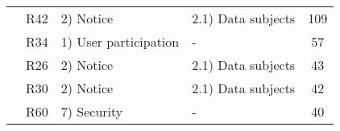 \begin{table}[ht]
{\begin{tabular}{@{}ccllc@{}}
		\multicolumn{1}{l}{}                                  & R42                  & 2) Notice                             & 2.1) Data subjects                                                     & 109                                                                        \\
		\multicolumn{1}{l}{}                                  & R34                  & 1) User participation                 & -                                                                      & 57                                                                         \\
		\multicolumn{1}{l}{}                                  & R26                  & 2) Notice                             & 2.1) Data subjects                                                     & 43                                                                         \\
		\multicolumn{1}{l}{}                                  & R30                  & 2) Notice                             & 2.1) Data subjects                                                     & 42                                                                         \\
		\multicolumn{1}{l}{}                                  & R60                  & 7) Security                           & -                                                                      & 40                                                                         \\ \bottomrule
	\end{tabular}%
}
\end{table}

\begin{comment}
	\begin{figure}
		\centering
		\texttt{[image: Figures/"Top10-occ"]}
		\caption{Top 10 privacy requirements occurrences in Google Chrome and Moodle datasets}
		\label{fig:top10}
	\end{figure}
\end{comment}


